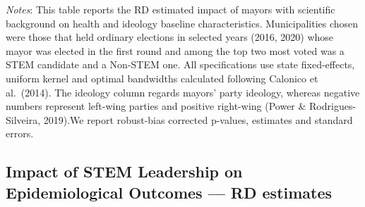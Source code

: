 \documentclass[
  letterpaper,
  DIV=11,
  numbers=noendperiod]{scrartcl}
\begin{document}
\emph{Notes}: This table reports the RD estimated impact of mayors with
scientific background on health and ideology baseline characteristics.
Municipalities chosen were those that held ordinary elections in
selected years (2016, 2020) whose mayor was elected in the first round
and among the top two most voted was a STEM candidate and a Non-STEM
one. All specifications use state fixed-effects, uniform kernel and
optimal bandwidths calculated following Calonico et al.~(2014). The
ideology column regards mayors' party ideology, whereas negative numbers
represent left-wing parties and positive right-wing (Power \&
Rodrigues-Silveira, 2019).We report robust-bias corrected p-values,
estimates and standard errors.

\subsection{Impact of STEM Leadership on Epidemiological Outcomes --- RD
estimates}\label{impact-of-stem-leadership-on-epidemiological-outcomes-rd-estimates}
\end{document}
